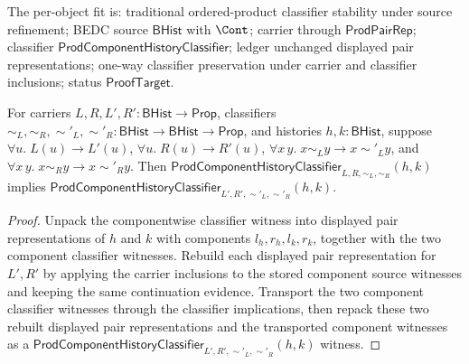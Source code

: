 \begin{theorem}
\label{thm:prod-component-history-classifier-source-refinement}
The per-object fit is: traditional ordered-product classifier stability under
source refinement; BEDC source $\mathsf{BHist}$ with $\Cont$; carrier through
$\mathsf{ProdPairRep}$; classifier
$\mathsf{ProdComponentHistoryClassifier}$; ledger unchanged displayed pair
representations; one-way classifier preservation under carrier and classifier
inclusions; status $\mathsf{ProofTarget}$.

For carriers $L,R,L',R':\mathsf{BHist}\to\mathsf{Prop}$, classifiers
$\sim_L,\sim_R,\sim'_L,\sim'_R:\mathsf{BHist}\to\mathsf{BHist}\to\mathsf{Prop}$,
and histories $h,k:\mathsf{BHist}$, suppose $\forall u.\;L(u)\to L'(u)$, $\forall u.\;R(u)\to R'(u)$,
$\forall x\,y.\;x\sim_L y\to x\sim'_L y$, and
$\forall x\,y.\;x\sim_R y\to x\sim'_R y$. Then
$\mathsf{ProdComponentHistoryClassifier}_{L,R,\sim_L,\sim_R}(h,k)$ implies
$\mathsf{ProdComponentHistoryClassifier}_{L',R',\sim'_L,\sim'_R}(h,k)$.
\end{theorem}
\begin{proof}
Unpack the componentwise classifier witness into displayed pair
representations of $h$ and $k$ with components $l_h,r_h,l_k,r_k$, together
with the two component classifier witnesses. Rebuild each displayed pair
representation for $L',R'$ by applying the carrier inclusions to the stored
component source witnesses and keeping the same continuation evidence.
Transport the two component classifier witnesses through the classifier
implications, then repack these two rebuilt displayed pair representations and
the transported component witnesses as a
$\mathsf{ProdComponentHistoryClassifier}_{L',R',\sim'_L,\sim'_R}(h,k)$
witness.
\end{proof}





